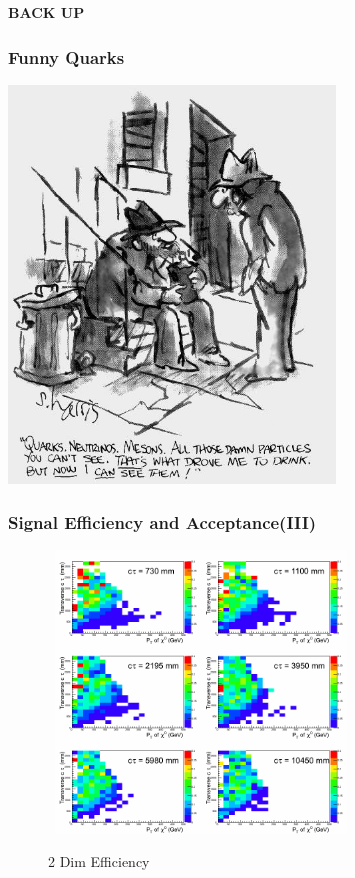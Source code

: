 \documentclass{beamer}
\begin{document}
{
\begin{frame}
  \begin{center}
   \textcolor{UMN@Maroon}{\Huge{\textbf{BACK UP}} }
  \end{center}
\end{frame}
}

\begin{frame}
\frametitle{Funny Quarks}
 \includegraphics[height=0.65\textwidth,width=0.65\textwidth]{THESISPLOTS/New-Physics-PLOTS/FunnyQuarks.jpg}
\end{frame}

\begin{frame}
\frametitle{Signal Efficiency and Acceptance(III)}
  \begin{figure}[ht]
   \begin{minipage}[b]{0.7\linewidth}
    \mbox{
  \centering
  \includegraphics[height=7.5cm, width=0.65\paperwidth]{THESISPLOTS/Eff180_xPt_ct.png} }
    \vspace{-0.5cm}
    \caption{2 Dim Efficiency}
  \end{minipage}
 \end{figure}
\end{frame}
\end{document}
